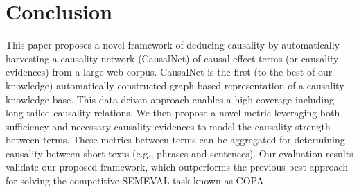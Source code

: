 \section{Conclusion}
\label{sec:conclude}
This paper proposes a novel framework of
deducing causality by automatically harvesting a
causality network (CausalNet) of causal-effect terms (or causality evidences)
from a large web corpus.
CausalNet is the first (to the best of our
knowledge) automatically constructed graph-based
representation of a causality knowledge base.
This data-driven approach enables
a high coverage including long-tailed causality
relations.
We then propose a novel metric leveraging both sufficiency and
necessary causality evidences
to model the causality strength
between terms.
These metrics between terms can be aggregated for
determining causality
between short texts (e.g., phrases and sentences).
Our evaluation results validate our proposed framework, which outperforms
the previous best approach for solving the competitive SEMEVAL task
known as COPA.
